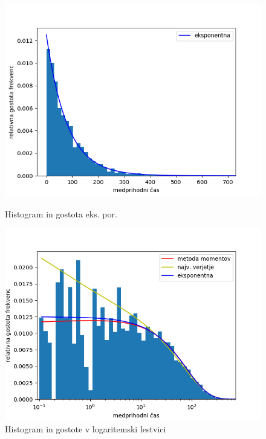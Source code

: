 \documentclass[12pt, a4paper]{article}
\begin{document}
\begin{figure}
    \centering
    \begin{minipage}{0.45\textwidth}
        \centering
        \includegraphics[width=\textwidth]{histogram_eksponentna.png} %
        \caption{Histogram in gostota eks. por.}
    \end{minipage}\hfill
    \begin{minipage}{0.45\textwidth}
        \centering
        \includegraphics[width=\textwidth]{histogram_log_vse.png} %
        \caption{Histogram in gostote v logaritemski lestvici}
    \end{minipage}
\end{figure}
\end{document}
